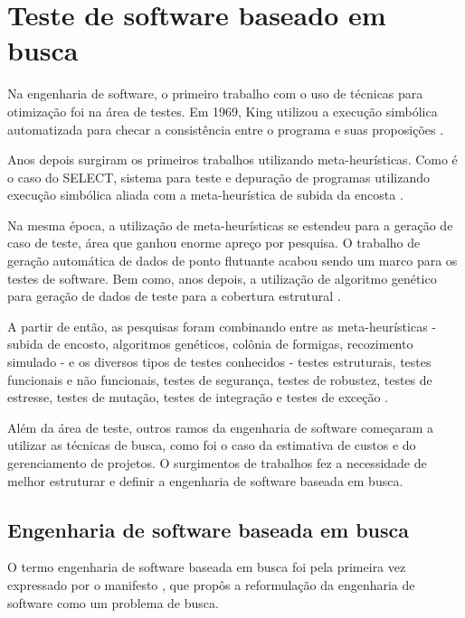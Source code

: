 \section{Teste de software baseado em busca}

Na engenharia de software, o primeiro trabalho com o uso de técnicas para otimização foi na área de testes. Em 1969, King utilizou a execução simbólica automatizada para checar a consistência entre o programa e suas proposições \cite{king1969program}. 

Anos depois surgiram os primeiros trabalhos utilizando meta-heurísticas. Como é o caso do SELECT, sistema para teste e depuração de programas utilizando execução simbólica aliada com a meta-heurística de subida da encosta \cite{boyer1975select}.

Na mesma época, a utilização de meta-heurísticas se estendeu para a geração de caso de teste, área que ganhou enorme apreço por pesquisa. O trabalho de geração automática de dados de ponto flutuante \cite{miller1976automatic} acabou sendo um marco para os testes de software. Bem como, anos depois, a utilização de algoritmo genético para geração de dados de teste para a cobertura estrutural \cite{xanthakis1992application}.

A partir de então, as pesquisas foram combinando entre as meta-heurísticas - subida de encosto, algoritmos genéticos, colônia de formigas, recozimento simulado - e os diversos tipos de testes  conhecidos - testes estruturais, testes funcionais e não funcionais, testes de segurança, testes de robustez, testes de estresse, testes de mutação, testes de integração e testes de exceção \cite{harman2009search}.

Além da área de teste, outros ramos da engenharia de software começaram a utilizar as técnicas de busca, como foi o caso da estimativa de custos e do gerenciamento de projetos. O surgimentos de trabalhos fez a necessidade de melhor estruturar e definir a engenharia de software baseada em busca.

\subsection{Engenharia de software baseada em busca}

O termo engenharia de software baseada em busca foi pela primeira vez expressado por o manifesto \cite{harman2001search}, que propôs a reformulação da engenharia de software como um problema de busca. 



